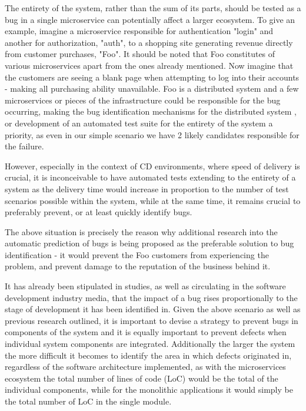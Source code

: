 The entirety of the system, rather than the sum of its parts, should be tested as a bug in a single microservice can potentially affect a larger ecosystem. To give an example, imagine a microservice responsible for authentication "login" and another for authorization, "auth", to a shopping site generating revenue directly from customer purchases, "Foo". It should be noted that Foo constitutes of various microservices apart from the ones already mentioned. Now imagine that the customers are seeing a blank page when attempting to log into their accounts - making all purchasing ability unavailable. Foo is a distributed system and a few microservices or pieces of the infrastructure could be responsible for the bug occurring, making the bug identification mechanisms for the distributed system , or development of an automated test suite for the entirety of the system a priority, as even in our simple scenario we have 2 likely candidates responsible for the failure. 

However, especially in the context of CD environments, where speed of delivery is crucial, it is inconceivable to have automated tests extending to the entirety of a system as the delivery time would increase in proportion to the number of test scenarios possible within the system\cite{softwareTestingChallenges}, while at the same time, it remains crucial to preferably prevent, or at least quickly identify bugs. 

The above situation is precisely the reason why additional research into the automatic prediction of bugs is being proposed as the preferable solution to bug identification - it would prevent the Foo customers from experiencing the problem, and prevent damage to the reputation of the business behind it.

It has already been stipulated in studies\cite{autoDetectionOfPerfBugs}, as well as circulating in the software development industry media\cite{costOfBugInRelationToDevelopmentPhase}, that the impact of a bug rises proportionally to the stage of development it has been identified in.
Given the above scenario as well as previous research outlined\cite{bugDetectionInParticleSwarm}, it is important to devise a strategy to prevent bugs in components of the system and it is equally important to prevent defects when individual system components are integrated. Additionally the larger the system the more difficult it becomes to identify the area in which defects originated in\cite{Zhou_2012_whereShouldBugsBeFixed}, regardless of the software architecture implemented, as with the microservices ecosystem the total number of lines of code (LoC) would be the total of the individual components, while for the monolithic applications it would simply be the total number of LoC in the single module. 

